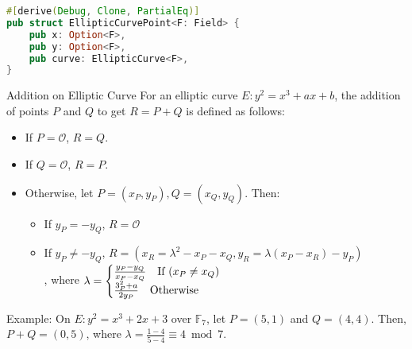 \documentclass{article}
\begin{document}
\begin{lstlisting}[language=Rust, caption=Implementation of Rational Point]
#[derive(Debug, Clone, PartialEq)]
pub struct EllipticCurvePoint<F: Field> {
    pub x: Option<F>,
    pub y: Option<F>,
    pub curve: EllipticCurve<F>,
}
\end{lstlisting}

\begin{definition}{Addition on Elliptic Curve}{}
For an elliptic curve $E: y^2 = x^3 + ax + b$, the addition of points $P$ and $Q$ to get $R = P + Q$ is defined as follows:

   \begin{itemize}
       \item If $P = \mathcal{O}$, $R = Q$.
       \item If $Q = \mathcal{O}$, $R = P$.
       \item Otherwise, let $P = (x_P, y_P), Q = (x_Q, y_Q)$. Then:
       \begin{itemize}
           \item If $y_P = -y_Q$, $R = \mathcal{O}$
           \item If $y_P \neq -y_Q$, $R = (x_R = \lambda^2 - x_P - x_Q, y_R = \lambda(x_P - x_R) - y_P)$\\, where $\lambda = \begin{cases}
               \frac{y_P - y_Q}{x_P - x_Q} \quad \hbox{If } (x_P \neq x_Q) \\
               \frac{3^{2}_{P} + a}{2y_P} \quad \hbox{Otherwise}
           \end{cases}$
       \end{itemize}
   \end{itemize}
\end{definition}

Example: On $E: y^2 = x^3 + 2x + 3$ over $\mathbb{F}_{7}$, let $P = (5, 1)$ and $Q = (4, 4)$. Then, $P + Q = (0, 5)$, where $\lambda = \frac{1 - 4}{5 - 4} \equiv 4 \bmod 7$.
\end{document}
